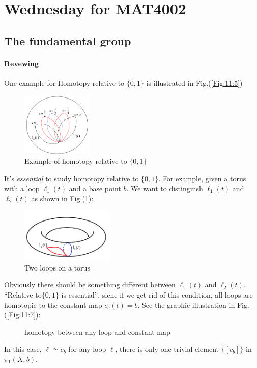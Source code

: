 \section{Wednesday for MAT4002}
\subsection{The fundamental group}
\paragraph{Revewing}
One example for Homotopy relative to $\{0,1\}$ is illustrated in Fig.(\ref{Fig:11:5})
\begin{figure}[H]
\centering
\includegraphics[width=0.3\textwidth]{week11/relative.png}
\caption{Example of homotopy relative to $\{0,1\}$}
\end{figure}
It's \emph{essential} to study homotopy relative to $\{0,1\}$.
For example, given a torus with a loop $\ell_1(t)$ and a base point $b$.
We want to distinguish $\ell_1(t)$ and $\ell_2(t)$ as shown in Fig.(\ref{Fig:11:6}):
\begin{figure}[H]
\centering
\includegraphics[width=0.4\textwidth]{week11/twolooptorus.png}
\caption{Two loops on a torus}
\label{Fig:11:6}
\end{figure}
Obviously there should be something different between $\ell_1(t)$ and $\ell_2(t)$.
``Relative to$\{0,1\}$ is essential'', sicne if we get rid of this condition, all loops are homotopic to the constant map $c_b(t)=b$. See the graphic illustration in Fig.(\ref{Fig:11:7}):
\begin{figure}[H]
	\caption{homotopy between any loop and constant map}
	\label{fig: 1:7}
\end{figure}
In this case, $\ell\simeq c_b$ for any loop $\ell$, there is only one trivial element $\{[c_b]\}$ in $\pi_1(X,b)$.

